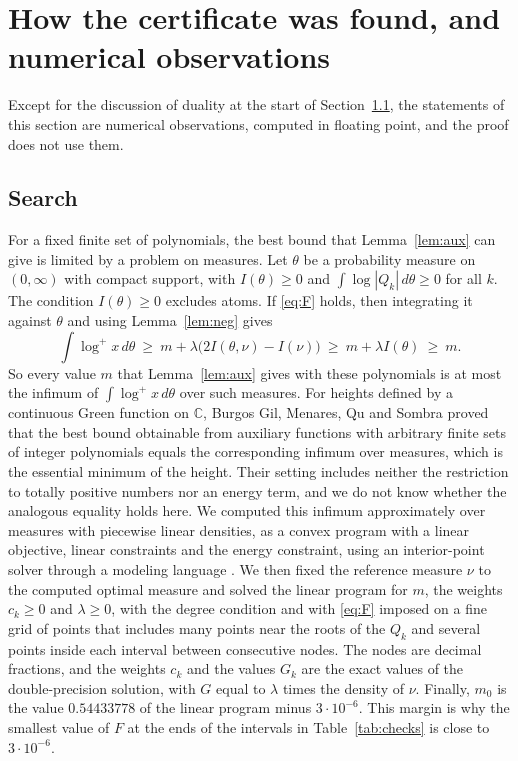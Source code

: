 \documentclass[11pt]{amsart}
\theoremstyle{remark}
\numberwithin{equation}{section}
\newcommand{\C}{\mathbb{C}}
\newcommand{\logp}{\log^{+}}
\newcommand{\Margin}{3\cdot10^{-6}}
\newcommand{\MDual}{0.54433778}
\begin{document}
\section{How the certificate was found, and numerical observations}\label{sec:obs}

Except for the discussion of duality at the start of Section~\ref{sec:search}, the statements of this section are numerical observations, computed in floating point, and the proof does not use them.

\subsection{Search}\label{sec:search}
For a fixed finite set of polynomials, the best bound that Lemma~\ref{lem:aux} can give is limited by a problem on measures. Let $\theta$ be a probability measure on $(0,\infty)$ with compact support, with $I(\theta)\ge0$ and $\int\log|Q_k|\,d\theta\ge0$ for all $k$. The condition $I(\theta)\ge0$ excludes atoms. If \eqref{eq:F} holds, then integrating it against $\theta$ and using Lemma~\ref{lem:neg} gives
\[
\int\logp x\,d\theta\ \ge\ m+\lambda\bigl(2I(\theta,\nu)-I(\nu)\bigr)\ \ge\ m+\lambda I(\theta)\ \ge\ m.
\]
So every value $m$ that Lemma~\ref{lem:aux} gives with these polynomials is at most the infimum of $\int\logp x\,d\theta$ over such measures. For heights defined by a continuous Green function on $\C$, Burgos Gil, Menares, Qu and Sombra \cite[Theorem~D]{BMQS26} proved that the best bound obtainable from auxiliary functions with arbitrary finite sets of integer polynomials equals the corresponding infimum over measures, which is the essential minimum of the height. Their setting includes neither the restriction to totally positive numbers nor an energy term, and we do not know whether the analogous equality holds here. We computed this infimum approximately over measures with piecewise linear densities, as a convex program with a linear objective, linear constraints and the energy constraint, using an interior-point solver \cite{Clarabel} through a modeling language \cite{CVXPY}. We then fixed the reference measure $\nu$ to the computed optimal measure and solved the linear program for $m$, the weights $c_k\ge0$ and $\lambda\ge0$, with the degree condition and with \eqref{eq:F} imposed on a fine grid of points that includes many points near the roots of the $Q_k$ and several points inside each interval between consecutive nodes. The nodes are decimal fractions, and the weights $c_k$ and the values $G_k$ are the exact values of the double-precision solution, with $G$ equal to $\lambda$ times the density of $\nu$. Finally, $m_0$ is the value $\MDual$ of the linear program minus $\Margin$. This margin is why the smallest value of $F$ at the ends of the intervals in Table~\ref{tab:checks} is close to $3\cdot10^{-6}$.
\end{document}
